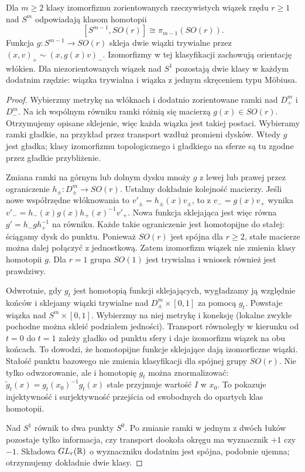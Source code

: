 \begin{twierdzenie}
\label{thm:clutching-16}
Dla $m\geq2$ klasy izomorfizmu zorientowanych
rzeczywistych wiązek
rzędu $r\geq1$ nad $S^m$
odpowiadają klasom homotopii
\[
 [S^{m-1},SO(r)]
 \cong\pi_{m-1}(SO(r)).
\]
Funkcja $g:S^{m-1}\to SO(r)$
skleja dwie wiązki
trywialne przez
$(x,v)_+\sim(x,g(x)v)_-$.
Izomorfizmy w tej klasyfikacji zachowują orientację włókien.
Dla niezorientowanych
wiązek nad $S^1$ pozostają
dwie klasy w każdym dodatnim
rzędzie: wiązka trywialna
i wiązka z jednym skręceniem
typu Möbiusa.
\end{twierdzenie}
\begin{proof}
Wybierzmy metrykę na włóknach
i dodatnio zorientowane ramki
nad $D^m_+$ i $D^m_-$.
Na ich wspólnym równiku
ramki różnią się macierzą
$g(x)\in SO(r)$. Otrzymujemy
opisane sklejenie, więc
każda wiązka jest takiej
postaci. Wybieramy ramki gładkie, na przykład przez transport
wzdłuż promieni dysków. Wtedy $g$ jest gładka;
klasy izomorfizmu
topologicznego i gładkiego
na sferze są tu zgodne
przez gładkie przybliżenie.

Zmiana ramki na górnym
lub dolnym dysku mnoży
$g$ z lewej lub prawej
przez ograniczenie
$h_\pm:D^m_\pm\to SO(r)$.
Ustalmy dokładnie kolejność macierzy.
Jeśli nowe współrzędne włóknowania to
$v'_\pm=h_\pm(x)v_\pm$, to z $v_-=g(x)v_+$
wynika $v'_-=h_-(x)g(x)h_+(x)^{-1}v'_+$.
Nowa funkcja sklejająca jest więc równa
$g'=h_-g h_+^{-1}$ na równiku.
Każde takie ograniczenie
jest homotopijne do stałej:
ściągamy dysk do punktu.
Ponieważ $SO(r)$ jest
spójna dla $r\geq2$,
stałe macierze można
dalej połączyć z
jednostkową. Zatem
izomorfizm wiązek
nie zmienia klasy
homotopii $g$.
Dla $r=1$ grupa $SO(1)$
jest trywialna i wniosek
również jest prawdziwy.

Odwrotnie, gdy $g_t$ jest homotopią funkcji
sklejających, wygładzamy ją względnie końców i sklejamy
wiązki trywialne nad
$D^m_\pm\times[0,1]$
za pomocą $g_t$.
Powstaje wiązka nad
$S^m\times[0,1]$.
Wybierzmy na niej
metrykę i koneksję
(lokalne zwykłe pochodne
można skleić podziałem
jedności). Transport
równoległy w kierunku
od $t=0$ do $t=1$
zależy gładko od punktu
sfery i daje izomorfizm
wiązek na obu końcach.
To dowodzi, że homotopijne
funkcje sklejające
dają izomorficzne wiązki.
Stałość punktu bazowego
nie zmienia klasyfikacji dla spójnej grupy $SO(r)$.
Nie tylko odwzorowanie, ale i homotopię $g_t$ można
znormalizować: $\widetilde g_t(x)=g_t(x_0)^{-1}g_t(x)$
stale przyjmuje wartość $I$ w $x_0$. To pokazuje
injektywność i surjektywność przejścia od swobodnych
do opartych klas homotopii.

Nad $S^1$ równik to
dwa punkty $S^0$.
Po zmianie ramki w
jednym z dwóch łuków
pozostaje tylko informacja,
czy transport dookoła
okręgu ma wyznacznik
$+1$ czy $-1$.
Składowa $GL_r(\mathbb{R})$
o wyznaczniku dodatnim
jest spójna, podobnie
ujemna; otrzymujemy
dokładnie dwie klasy.
\end{proof}

